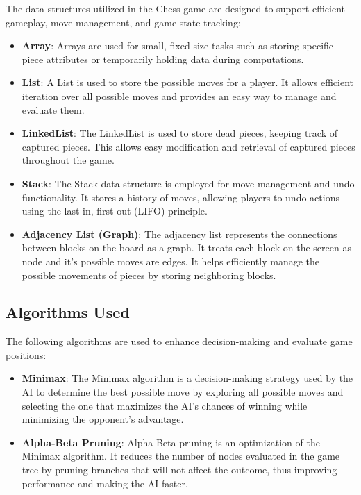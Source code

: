 \documentclass[a4paper,12pt]{article}
\begin{document}
The data structures utilized in the Chess game are designed to support efficient gameplay, move management, and game state tracking:

\begin{itemize}
    \item \textbf{Array}: Arrays are used for small, fixed-size tasks such as storing specific piece attributes or temporarily holding data during computations.
    \item \textbf{List}: A List is used to store the possible moves for a player. It allows efficient iteration over all possible moves and provides an easy way to manage and evaluate them.
    \item \textbf{LinkedList}: The LinkedList is used to store dead pieces, keeping track of captured pieces. This allows easy modification and retrieval of captured pieces throughout the game.
    \item \textbf{Stack}: The Stack data structure is employed for move management and undo functionality. It stores a history of moves, allowing players to undo actions using the last-in, first-out (LIFO) principle.
    \item \textbf{Adjacency List (Graph)}: The adjacency list represents the connections between blocks on the board as a graph. It treats each block on the screen as node and it's possible moves are edges. It helps efficiently manage the possible movements of pieces by storing neighboring blocks.
\end{itemize}

\subsection{Algorithms Used}

The following algorithms are used to enhance decision-making and evaluate game positions:

\begin{itemize}
    \item \textbf{Minimax}: The Minimax algorithm is a decision-making strategy used by the AI to determine the best possible move by exploring all possible moves and selecting the one that maximizes the AI's chances of winning while minimizing the opponent's advantage.
    \item \textbf{Alpha-Beta Pruning}: Alpha-Beta pruning is an optimization of the Minimax algorithm. It reduces the number of nodes evaluated in the game tree by pruning branches that will not affect the outcome, thus improving performance and making the AI faster.
\end{itemize}
\end{document}
